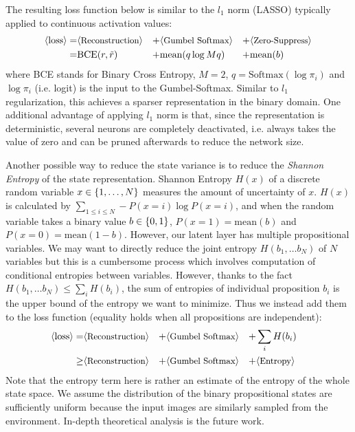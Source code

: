 The resulting loss function below is similar to the $l_1$ norm (LASSO) typically
applied to continuous activation values:
\begin{align*}
 \brackets{\text{loss}} = & \brackets{\text{\small Reconstruction}} &+ & \brackets{\text{\small Gumbel Softmax}} &+ & \brackets{\text{\small Zero-Suppress}} \\ 
 =                        & \text{BCE}(r,\tilde{r})     &+ & \text{mean}(q \log Mq)           &+ & \text{mean}(b)                  
\end{align*}
where BCE stands for Binary Cross Entropy,
$M=2$, $q=\text{Softmax}(\log \pi_i)$ and $\log \pi_i$ (i.e. logit) is the input to the Gumbel-Softmax.
Similar to $l_1$ regularization, this achieves a sparser representation in the binary domain.
One additional advantage of applying $l_1$ norm is that, since the representation is deterministic,
several neurons are completely deactivated, i.e. always takes the value of zero
and can be pruned afterwards to reduce the network size.

Another possible way to reduce the state variance is to reduce the
\emph{Shannon Entropy} of the state representation.
Shannon Entropy $H(x)$ of a discrete random variable $x\in {\left\{1,\ldots,N\right\}}$
measures the amount of uncertainty of $x$.
% 
$H(x)$ is calculated by $\sum_{1\leq i \leq N} -P(x=i)\log P(x=i)$,
and when the random variable takes a binary value
$b\in{\left\{0,1\right\}}$, $P(x=1)=\text{mean}(b)$ and $P(x=0)=\text{mean}(1-b)$.
% 
However, our latent layer has multiple
propositional variables. 
We may want to directly reduce the joint entropy
$H(b_1,\ldots b_N)$ of $N$ variables but this is a cumbersome process which involves
computation of conditional entropies between variables.
However, thanks to the fact $H(b_1,\ldots b_N) \leq \sum_{i} H(b_i)$,
the sum of entropies of individual proposition $b_i$ is the upper bound of the entropy we want to minimize.
Thus we instead add them to the loss function (equality holds when all propositions are independent):
\begin{align*}
 \brackets{\text{loss}} =    & \brackets{\text{\small Reconstruction}} &+ & \brackets{\text{\small Gumbel Softmax}} &+ & \sum_{i} H(b_i)& \\
                        \geq & \brackets{\text{\small Reconstruction}} &+ & \brackets{\text{\small Gumbel Softmax}} &+ & \brackets{\text{\small Entropy}}
\end{align*}
Note that the entropy term here is rather an estimate of the entropy of the whole state space.
We assume the distribution of the binary propositional states are sufficiently uniform
because the input images are similarly sampled from the environment.
In-depth theoretical analysis is the future work.

